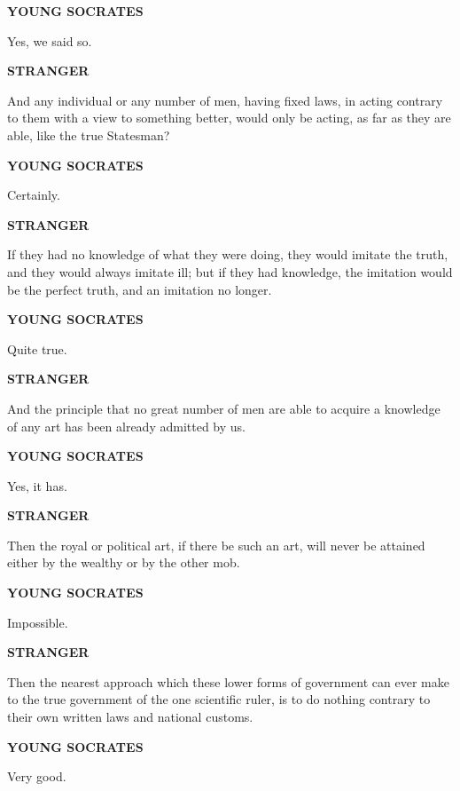 \documentclass[11pt,letter]{article}
\begin{document}
\par \textbf{YOUNG SOCRATES}
\par   Yes, we said so.

\par \textbf{STRANGER}
\par   And any individual or any number of men, having fixed laws, in acting contrary to them with a view to something better, would only be acting, as far as they are able, like the true Statesman?

\par \textbf{YOUNG SOCRATES}
\par   Certainly.

\par \textbf{STRANGER}
\par   If they had no knowledge of what they were doing, they would imitate the truth, and they would always imitate ill; but if they had knowledge, the imitation would be the perfect truth, and an imitation no longer.

\par \textbf{YOUNG SOCRATES}
\par   Quite true.

\par \textbf{STRANGER}
\par   And the principle that no great number of men are able to acquire a knowledge of any art has been already admitted by us.

\par \textbf{YOUNG SOCRATES}
\par   Yes, it has.

\par \textbf{STRANGER}
\par   Then the royal or political art, if there be such an art, will never be attained either by the wealthy or by the other mob.

\par \textbf{YOUNG SOCRATES}
\par   Impossible.

\par \textbf{STRANGER}
\par   Then the nearest approach which these lower forms of government can ever make to the true government of the one scientific ruler, is to do nothing contrary to their own written laws and national customs.

\par \textbf{YOUNG SOCRATES}
\par   Very good.
\end{document}

